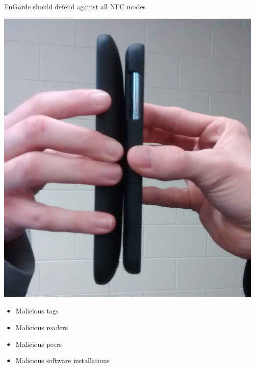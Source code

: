 \documentclass[unknownkeysallowed]{beamer}
\begin{document}
\begin{frame}
\begin{center}
\begin{block}{EnGarde should defend against all NFC modes}
\begin{center}
        \includegraphics[width=\linewidth,height=0.3\textheight,keepaspectratio]{figures/peer.jpg}

        \vspace{3mm}

        \begin{minipage}{.7\textwidth}
          \begin{itemize}
            \item{Malicious tags}
            \item{Malicious readers}
            \item{Malicious peers}
            \item{Malicious software installations}
          \end{itemize}
        \end{minipage}

      \end{center}
    \end{block}
  \end{center}
\end{frame}
\end{document}
